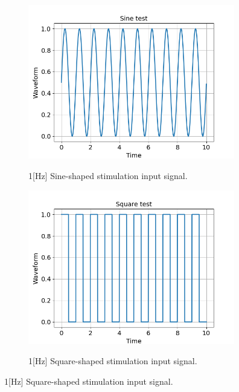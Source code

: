 \documentclass{cmc}
\begin{document}
\begin{figure}[H]
  \centering
  \begin{subfigure}[b]{0.48\textwidth}
    { \centering
      \includegraphics[width=0.99\textwidth]{figures/2b_Sine_test.png} }
    \caption{1[Hz] Sine-shaped stimulation input signal.}
    \label{fig:2b_sine_signal}
  \end{subfigure}
  \begin{subfigure}[b]{0.48\textwidth}
    { \centering
      \includegraphics[width=0.99\textwidth]{figures/2b_Square_test.png} }
    \caption{1[Hz] Square-shaped stimulation input signal.}
    \label{fig:2b_sine_phase}
  \end{subfigure}
  

\end{figure}
\end{document}
